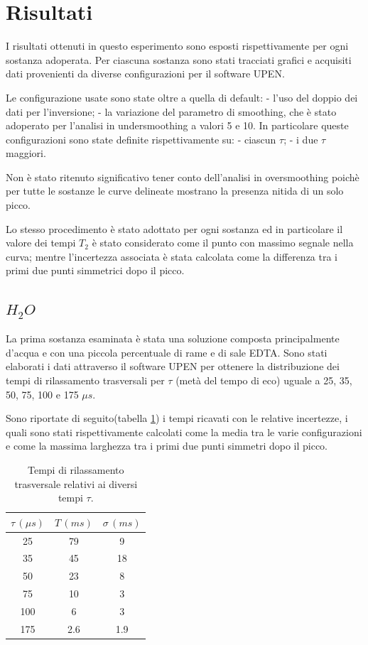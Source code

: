 \section*{Risultati}
I risultati ottenuti in questo esperimento sono esposti rispettivamente per ogni sostanza adoperata. 
Per ciascuna sostanza sono stati tracciati grafici e acquisiti dati provenienti da diverse configurazioni per il software UPEN. 

Le configurazione usate sono state oltre a quella di default:  - l'uso del doppio dei dati per l'inversione; - la variazione del parametro di smoothing, che è stato adoperato per l'analisi in undersmoothing a valori 5 e 10.
In particolare queste configurazioni sono state definite rispettivamente su: - ciascun $\tau$; - i due $\tau$ maggiori.

Non è stato ritenuto significativo tener conto dell'analisi in oversmoothing poichè per tutte le sostanze le curve delineate mostrano la presenza nitida di un solo picco.

Lo stesso procedimento è stato adottato per ogni sostanza ed in particolare il valore dei tempi $T_2$ è stato considerato come il punto con massimo segnale nella curva; mentre l'incertezza associata è stata calcolata come la differenza tra i primi due punti simmetrici dopo il picco.

\subsection*{$H_2O$}
La prima sostanza esaminata è stata una soluzione composta principalmente d'acqua e con una piccola percentuale di rame e di sale EDTA.
Sono stati elaborati i dati attraverso il software UPEN per ottenere la distribuzione dei tempi di rilassamento trasversali per $\tau$ (metà del tempo di eco) uguale a 25, 35, 50, 75, 100 e 175 ${\mu}s$.

Sono riportate di seguito(tabella \ref{tab:T_h2o}) i tempi ricavati con le relative incertezze, i quali sono stati rispettivamente calcolati come la media tra le varie configurazioni e come la massima larghezza tra i primi due punti simmetri dopo il picco.

\begin{table}[h!]
    \begin{center}
    \begin{tabular}{c c c}
    \toprule
    	${\tau}\,({\mu}s)$ & $T\,(ms)$ & ${\sigma}\,(ms)$ \\
    \midrule
	25 & 79 & 9 \\
	35 & 45 & 18 \\
	50 & 23 & 8 \\
	75 & 10 & 3 \\
	100 & 6 & 3 \\
	175 & 2.6 & 1.9\\
    \bottomrule
    \end{tabular}
    \caption{Tempi di rilassamento trasversale relativi ai diversi tempi $\tau$.}
    \label{tab:T_h2o}
    \end{center}
\end{table}

